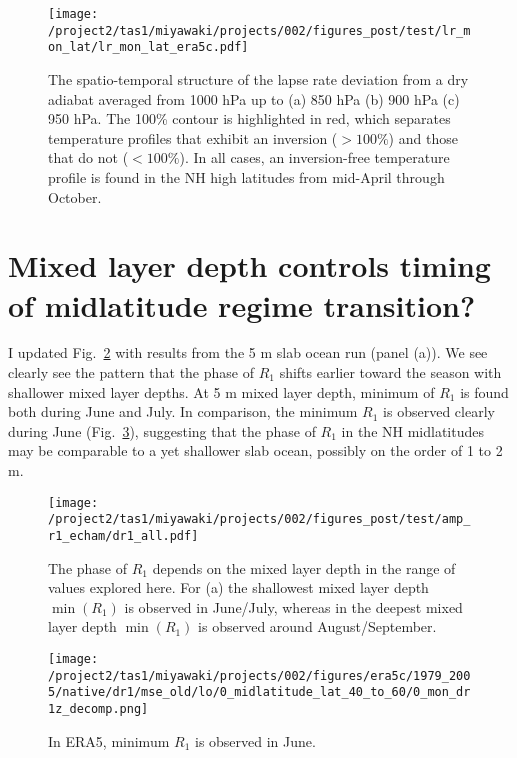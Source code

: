 \documentclass{article}
\begin{document}
\begin{figure}
    \texttt{[image: /project2/tas1/miyawaki/projects/002/figures\_post/test/lr\_mon\_lat/lr\_mon\_lat\_era5c.pdf]}
    \caption{The spatio-temporal structure of the lapse rate deviation from a dry adiabat averaged from 1000 hPa up to (a) 850 hPa (b) 900 hPa (c) 950 hPa. The 100\% contour is highlighted in red, which separates temperature profiles that exhibit an inversion ($>100\%$) and those that do not ($<100\%$). In all cases, an inversion-free temperature profile is found in the NH high latitudes from mid-April through October.}
    \label{fig:dalr-mon-lat-era5c}
\end{figure}

\section{Mixed layer depth controls timing of midlatitude regime transition?}
I updated Fig.~\ref{fig:dr1-all} with results from the 5 m slab ocean run (panel (a)). We see clearly see the pattern that the phase of $R_1$ shifts earlier toward the season with shallower mixed layer depths. At 5 m mixed layer depth, minimum of $R_1$ is found both during June and July. In comparison, the minimum $R_1$ is observed clearly during June (Fig.~\ref{fig:dr1-era5c}), suggesting that the phase of $R_1$ in the NH midlatitudes may be comparable to a yet shallower slab ocean, possibly on the order of 1 to 2 m.

\begin{figure}
    \texttt{[image: /project2/tas1/miyawaki/projects/002/figures\_post/test/amp\_r1\_echam/dr1\_all.pdf]}
    \caption{The phase of $R_1$ depends on the mixed layer depth in the range of values explored here. For (a) the shallowest mixed layer depth $\min(R_1)$ is observed in June/July, whereas in the deepest mixed layer depth $\min(R_1)$ is observed around August/September.}
    \label{fig:dr1-all}
\end{figure}

\begin{figure}
    \texttt{[image: /project2/tas1/miyawaki/projects/002/figures/era5c/1979\_2005/native/dr1/mse\_old/lo/0\_midlatitude\_lat\_40\_to\_60/0\_mon\_dr1z\_decomp.png]}
    \caption{In ERA5, minimum $R_1$ is observed in June.}
    \label{fig:dr1-era5c}
\end{figure}



\end{document}
